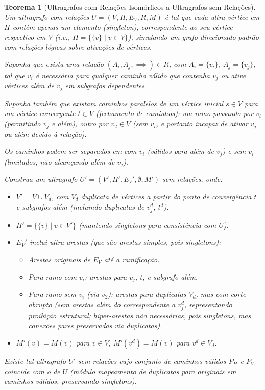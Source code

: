 \documentclass{article}
\newtheorem{theorem}{Teorema}
\begin{document}
\begin{theorem}[Ultragrafos com Relações Isomórficos a Ultragrafos sem Relações]
\hfill

Um ultragrafo com relações \( U = (V, H, E_V, R, M) \) é tal que cada ultra-vértice em \( H \) contém apenas um elemento (singleton), correspondente ao seu vértice respectivo em \( V \) (i.e., \( H = \{ \{v\} \mid v \in V \} \)), simulando um grafo direcionado padrão com relações lógicas sobre ativações de vértices.

Suponha que exista uma relação \( (A_i, A_j, \implies) \in R \), com \( A_i = \{v_i\} \), \( A_j = \{v_j\} \), tal que \( v_i \) é necessária para qualquer caminho válido que contenha \( v_j \) ou ative vértices além de \( v_j \) em subgrafos dependentes.

Suponha também que existam caminhos paralelos de um vértice inicial \( s \in V \) para um vértice convergente \( t \in V \) (fechamento de caminhos): um ramo passando por \( v_i \) (permitindo \( v_j \) e além), outro por \( v_2 \in V \) (sem \( v_i \), e portanto incapaz de ativar \( v_j \) ou além devido à relação).

Os caminhos podem ser separados em com \( v_i \) (válidos para além de \( v_j \)) e sem \( v_i \) (limitados, não alcançando além de \( v_j \)).

Construa um ultragrafo \( U' = (V', H', E_V', \emptyset, M') \) sem relações, onde:

\begin{itemize}
    \item \( V' = V \cup V_d \), com \( V_d \) duplicata de vértices a partir do ponto de convergência \( t \) e subgrafos além (incluindo duplicatas de \( v_j^d \), \( t^d \)).
    \item \( H' = \{ \{v\} \mid v \in V' \} \) (mantendo singletons para consistência com \( U \)).
    \item \( E_V' \) inclui ultra-arestas (que são arestas simples, pois singletons):
        \begin{itemize}
            \item Arestas originais de \( E_V \) até a ramificação.
            \item Para ramo com \( v_i \): arestas para \( v_j \), \( t \), e subgrafo além.
            \item Para ramo sem \( v_i \) (via \( v_2 \)): arestas para duplicatas \( V_d \), mas com corte abrupto (sem arestas além do correspondente a \( v_j^d \), representando proibição estrutural; hiper-arestas não necessárias, pois singletons, mas conexões pares preservadas via duplicatas).
        \end{itemize}
    \item \( M'(v) = M(v) \) para \( v \in V \), \( M'(v^d) = M(v) \) para \( v^d \in V_d \).
\end{itemize}

Existe tal ultragrafo \( U' \) sem relações cujo conjunto de caminhos válidos \( P_H \) e \( P_V \) coincide com o de \( U \) (módulo mapeamento de duplicatas para originais em caminhos válidos, preservando singletons).
\end{theorem}
\end{document}
